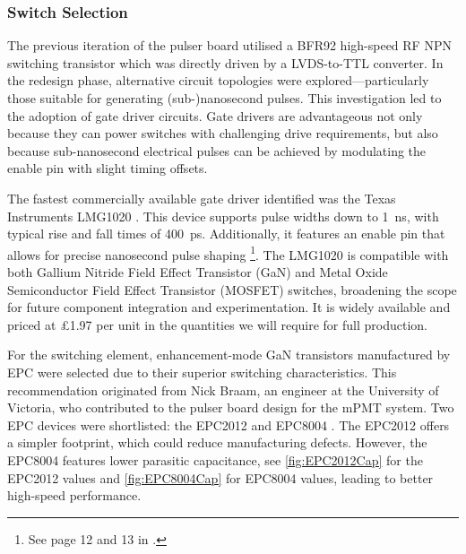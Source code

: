 \documentclass[a4paper,11pt]{article}
\begin{document}
\subsubsection{Switch Selection}

The previous iteration of the pulser board utilised a BFR92 \cite{BFR92} high-speed RF NPN switching transistor which was directly driven by a LVDS-to-TTL converter. In the redesign phase, alternative circuit topologies were explored—particularly those suitable for generating (sub-)nanosecond pulses. This investigation led to the adoption of gate driver circuits. Gate drivers are advantageous not only because they can power switches with challenging drive requirements, but also because sub-nanosecond electrical pulses can be achieved by modulating the enable pin with slight timing offsets.

The fastest commercially available gate driver identified was the Texas Instruments LMG1020 \cite{LMG1020}. This device supports pulse widths down to 1~ns, with typical rise and fall times of 400~ps. Additionally, it features an enable pin that allows for precise nanosecond pulse shaping \footnote{See page 12 and 13 in \cite{LMG1020}.}. The LMG1020 is compatible with both Gallium Nitride Field Effect Transistor (GaN) and Metal Oxide Semiconductor Field Effect Transistor (MOSFET) switches, broadening the scope for future component integration and experimentation. It is widely available and priced at £1.97 per unit in the quantities we will require for full production.

For the switching element, enhancement-mode GaN transistors manufactured by EPC were selected due to their superior switching characteristics. This recommendation originated from Nick Braam, an engineer at the University of Victoria, who contributed to the pulser board design for the mPMT system. Two EPC devices were shortlisted: the EPC2012 \cite{EPC2012} and EPC8004 \cite{EPC8004}. The EPC2012 offers a simpler footprint, which could reduce manufacturing defects. However, the EPC8004 features lower parasitic capacitance, see \cref{fig:EPC2012Cap} for the EPC2012 values and \cref{fig:EPC8004Cap} for EPC8004 values, leading to better high-speed performance.
\end{document}
